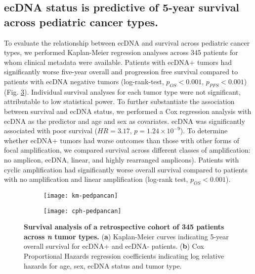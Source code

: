 \subsection{ecDNA status is predictive of 5-year survival across pediatric cancer types.}
To evaluate the relationship between ecDNA and survival across pediatric cancer types, we performed Kaplan-Meier regression analyses across 345 patients for whom clinical metadata were available. Patients with \gls{ecDNA+} tumors had significantly worse five-year overall and progression free survival compared to patients with ecDNA negative tumors (log-rank-test, $p_{OS} < 0.001$, $p_{PFS} < 0.001$) (Fig. \ref{fig:survival-pedpancan}). Individual survival analyses for each tumor type were not significant, attributable to low statistical power. To further substantiate the association between survival and ecDNA status, we performed a Cox regression analysis with ecDNA as the predictor and age and sex as covariates. ecDNA was significantly associated with poor survival ($HR=3.17$, $p = 1.24 \times 10^{-9}$). To determine whether \gls{ecDNA+} tumors had worse outcomes than those with other forms of focal amplification, we compared survival across different classes of amplification: no amplicon, ecDNA, linear, and highly rearranged amplicons). Patients with cyclic amplification had significantly worse overall survival compared to patients with no amplification and linear amplification (log-rank test, $p_{OS} < 0.001$). 

\begin{figure}[!h]
    \centering
    \begin{subfigure}{\textwidth}
        \centering
        \texttt{[image: km-pedpancan]}
        \caption{}
        \label{subfig:km-pedpancan}
    \end{subfigure}
    \begin{subfigure}{\textwidth}
        \centering
        \texttt{[image: cph-pedpancan]}
        \caption{}
        \label{subfig:cph-pedpancan}
    \end{subfigure}
    \caption[Survival analysis of a retrospective cohort of 345 patients across \textit{n} pediatric tumor types.]{\textbf{Survival analysis of a retrospective cohort of 345 patients across \textit{n} tumor types.} (\textbf{a}) Kaplan-Meier curves indicating 5-year overall survival for ecDNA+ and ecDNA- patients. (\textbf{b}) Cox Proportional Hazards regression coefficients indicating log relative hazards for age, sex, ecDNA status and tumor type.}
    \label{fig:survival-pedpancan}
\end{figure}

